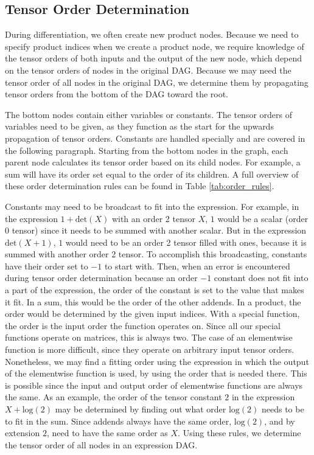 \documentclass[12pt, a4paper]{report} %
\begin{document}
\subsection{Tensor Order Determination}
During differentiation, we often create new product nodes.
Because we need to specify product indices when we create a product node, we require knowledge of the tensor orders of both inputs and the output of the new node, which depend on the tensor orders of nodes in the original DAG.
Because we may need the tensor order of all nodes in the original DAG, we determine them by propagating tensor orders from the bottom of the DAG toward the root.

The bottom nodes contain either variables or constants.
The tensor orders of variables need to be given, as they function as the start for the upwards propagation of tensor orders.
Constants are handled specially and are covered in the following paragraph.
Starting from the bottom nodes in the graph, each parent node calculates its tensor order based on its child nodes.
For example, a sum will have its order set equal to the order of its children.
A full overview of these order determination rules can be found in Table \ref{tab:order_rules}.

Constants may need to be broadcast to fit into the expression.
For example, in the expression $1 + \text{det}(X)$ with an order 2 tensor $X$, $1$ would be a scalar (order 0 tensor) since it needs to be summed with another scalar.
But in the expression $\text{det}(X + 1)$, $1$ would need to be an order 2 tensor filled with ones, because it is summed with another order 2 tensor.
To accomplish this broadcasting, constants have their order set to $-1$ to start with.
Then, when an error is encountered during tensor order determination because an order $-1$ constant does not fit into a part of the expression, the order of the constant is set to the value that makes it fit.
In a sum, this would be the order of the other addends.
In a product, the order would be determined by the given input indices.
With a special function, the order is the input order the function operates on. Since all our special functions operate on matrices, this is always two.
The case of an elementwise function is more difficult, since they operate on arbitrary input tensor orders.
Nonetheless, we may find a fitting order using the expression in which the output of the elementwise function is used, by using the order that is needed there.
This is possible since the input and output order of elementwise functions are always the same.
As an example, the order of the tensor constant $2$ in the expression $X + \text{log}(2)$ may be determined by finding out what order $\text{log}(2)$ needs to be to fit in the sum.
Since addends always have the same order, $\text{log}(2)$, and by extension $2$, need to have the same order as $X$.
Using these rules, we determine the tensor order of all nodes in an expression DAG.
\end{document}
